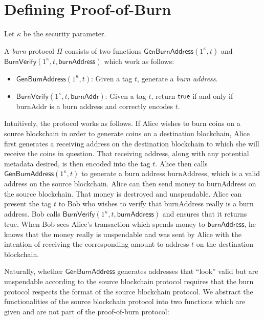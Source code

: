 \section{Defining Proof-of-Burn}

Let $\kappa$ be the security parameter.

\begin{definition}
  A \emph{burn} protocol $\Pi$ consists of two functions $\mathsf{GenBurnAddress}(1^\kappa, t)$ and $\mathsf{BurnVerify}(1^\kappa, t, \mathsf{burnAddress})$ which work as follows:

  \begin{itemize}
    \item $\mathsf{GenBurnAddress}(1^\kappa, t)$: Given a tag $t$, generate a \emph{burn address}.

    \item $\mathsf{BurnVerify}(1^\kappa, t, \mathsf{burnAddr})$: Given a tag $t$, return $\sf{true}$ if and only if \textsf{burnAddr} is a burn address and correctly encodes $t$.
  \end{itemize}
\end{definition}

Intuitively, the protocol works as follows. If Alice wishes to burn coins on a source blockchain in order to generate coins on a destination blockchain, Alice first generates a receiving address on the destination blockchain to which she will receive the coins in question. That receiving address, along with any potential metadata desired, is then encoded into the tag $t$. Alice then calls $\mathsf{GenBurnAddress}(1^\kappa, t)$ to generate a burn address \textsf{burnAddress}, which is a valid address on the source blockchain. Alice can then send money to \textsf{burnAddress} on the source blockchain. That money is destroyed and unspendable. Alice can present the tag $t$ to Bob who wishes to verify that \textsf{burnAddress} really is a burn address. Bob calls $\mathsf{BurnVerify}(1^\kappa, t, \mathsf{burnAddress})$ and ensures that it returns \textsf{true}. When Bob sees Alice's transaction which spends money to $\mathsf{burnAddress}$, he knows that the money really is unspendable and was sent by Alice with the intention of receiving the corresponding amount to address $t$ on the destination blockchain.

Naturally, whether $\mathsf{GenBurnAddress}$ generates addresses that ``look'' valid but are unspendable according to the source blockchain protocol requires that the burn protocol respects the format of the source blockchain protocol. We abstract the functionalities of the source blockchain protocol into two functions which are given and are not part of the proof-of-burn protocol:

